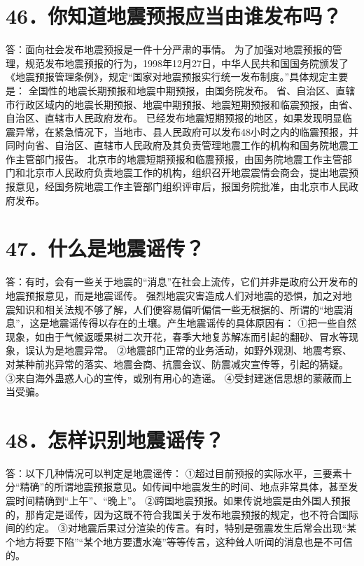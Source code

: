 \documentclass[a4paper,12pt,english]{sphinxmanual}
\begin{document}
\section{46．你知道地震预报应当由谁发布吗？}
\label{\detokenize{index:id52}}
答：面向社会发布地震预报是一件十分严肃的事情。
为了加强对地震预报的管理，规范发布地震预报的行为，1998年12月27日，中华人民共和国国务院颁发了《地震预报管理条例》，规定“国家对地震预报实行统一发布制度。”具体规定主要是：
全国性的地震长期预报和地震中期预报，由国务院发布。
省、自治区、直辖市行政区域内的地震长期预报、地震中期预报、地震短期预报和临震预报，由省、自治区、直辖市人民政府发布。
已经发布地震短期预报的地区，如果发现明显临震异常，在紧急情况下，当地市、县人民政府可以发布48小时之内的临震预报，并同时向省、自治区、直辖市人民政府及其负责管理地震工作的机构和国务院地震工作主管部门报告。
北京市的地震短期预报和临震预报，由国务院地震工作主管部门和北京市人民政府负责地震工作的机构，组织召开地震震情会商会，提出地震预报意见，经国务院地震工作主管部门组织评审后，报国务院批准，由北京市人民政府发布。


\section{47．什么是地震谣传？}
\label{\detokenize{index:id53}}
答：有时，会有一些关于地震的“消息”在社会上流传，它们并非是政府公开发布的地震预报意见，而是地震谣传。
强烈地震灾害造成人们对地震的恐惧，加之对地震知识和相关法规不够了解，人们便容易偏听偏信一些无根据的、所谓的“地震消息”，这是地震谣传得以存在的土壤。产生地震谣传的具体原因有：
①把一些自然现象，如由于气候返暖果树二次开花，春季大地复苏解冻而引起的翻砂、冒水等现象，误认为是地震异常。
②地震部门正常的业务活动，如野外观测、地震考察、对某种前兆异常的落实、地震会商、抗震会议、防震减灾宣传等，引起的猜疑。
③来自海外蛊惑人心的宣传，或别有用心的造谣。
④受封建迷信思想的蒙蔽而上当受骗。


\section{48．怎样识别地震谣传？}
\label{\detokenize{index:id54}}
答：以下几种情况可以判定是地震谣传：
①超过目前预报的实际水平，三要素十分“精确”的所谓地震预报意见。如传闻中地震发生的时间、地点非常具体，甚至发震时间精确到“上午”、“晚上”。
②跨国地震预报。如果传说地震是由外国人预报的，那肯定是谣传，因为这既不符合我国关于发布地震预报的规定，也不符合国际间的约定。
③对地震后果过分渲染的传言。有时，特别是强震发生后常会出现“某个地方将要下陷”“某个地方要遭水淹”等等传言，这种耸人听闻的消息也是不可信的。
\end{document}
